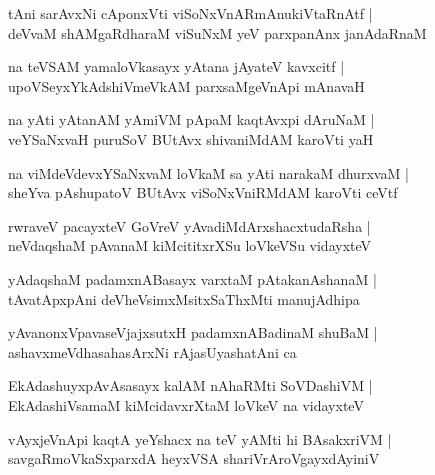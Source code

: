 \documentclass[twoside,12pt,openright]{book}
\newcounter{shloka}[chapter]
\begin{document}
\begin{shloka}%
tAni sarAvxNi cAponxVti viSoNxVnARmAnukiVtaRnAtf |\\
deVvaM shAMgaRdharaM viSuNxM yeV parxpanAnx janAdaRnaM 
\end{shloka}

\begin{shloka}%
na teVSAM yamaloVkasayx yAtana jAyateV kavxcitf |\\
upoVSeyxYkAdshiVmeVkAM parxsaMgeVnApi mAnavaH 
\end{shloka}

\begin{shloka}%
na yAti yAtanAM yAmiVM pApaM kaqtAvxpi dAruNaM |\\
veYSaNxvaH puruSoV BUtAvx shivaniMdAM karoVti yaH 
\end{shloka}

\begin{shloka}%
na viMdeVdevxYSaNxvaM loVkaM sa yAti narakaM dhurxvaM |\\
sheYva pAshupatoV BUtAvx viSoNxVniRMdAM karoVti ceVtf 
\end{shloka}

\begin{shloka}%
rwraveV pacayxteV GoVreV yAvadiMdArxshacxtudaRsha |\\
neVdaqshaM pAvanaM kiMcititxrXSu loVkeVSu vidayxteV 
\end{shloka}

\begin{shloka}%
yAdaqshaM padamxnABasayx varxtaM pAtakanAshanaM |\\
tAvatApxpAni deVheVsimxMsitxSaThxMti manujAdhipa
\end{shloka}

\begin{shloka}%
yAvanonxVpavaseVjajxsutxH padamxnABadinaM shuBaM |\\
ashavxmeVdhasahasArxNi rAjasUyashatAni ca
\end{shloka}

\begin{shloka}%
EkAdashuyxpAvAsasayx kalAM nAhaRMti SoVDashiVM |\\
EkAdashiVsamaM kiMcidavxrXtaM loVkeV na vidayxteV 
\end{shloka}

\begin{shloka}%
vAyxjeVnApi kaqtA yeYshacx na teV yAMti hi BAsakxriVM |\\
savgaRmoVkaSxparxdA heyxVSA shariVrAroVgayxdAyiniV
\end{shloka}
\end{document}
